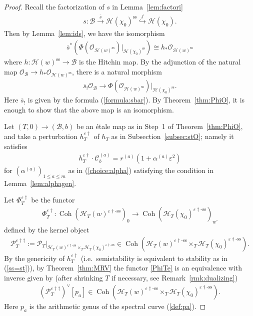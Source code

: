 \documentclass[11pt,oneside,a4paper,mathscr]{amsart}
\theoremstyle{definition}
\renewcommand{\leq}{\leqslant}
\newcommand{\cH}{\mathcal{H}}
\newcommand{\cB}{\mathcal{B}}
\newcommand{\cC}{\mathcal{C}}
\newcommand{\cP}{\mathcal{P}}
\newcommand{\cO}{\mathcal{O}}
\newcommand{\Coh}{\operatorname{Coh}}
\newcommand{\vd}{\varepsilon\dag}
\newcommand{\vdss}{\varepsilon\dag\text{-ss}}
\begin{document}
\begin{proof}
Recall the factorization of $s$ in Lemma~\ref{lem:factori}
\begin{align*}
s \colon \cB
\stackrel{\overline{s}}{\to}
\cH(\chi_0)^{\mathrm{ss}}
\stackrel{j}{\hookrightarrow}
\cH(\chi_0).
\end{align*}
Then by Lemma~\ref{lem:ids}, we have the isomorphism 
\begin{align*}
    \overline{s}^*(\Phi(\cO_{\cH(w)^{\mathrm{ss}}})|_{\cH(\chi_0)^{\mathrm{ss}}})\cong h_{*}\cO_{\cH(w)^{\mathrm{ss}}}
\end{align*}
where $h \colon \cH(w)^{\mathrm{ss}} \to \cB$ is the Hitchin map. 
By the adjunction of the natural map $\cO_{\cB} \to h_{*}\cO_{\cH(w)^{\mathrm{ss}}}$, 
there is a natural morphism
\begin{align}\label{map:sdag}
    \overline{s}_{!}\mathcal{O}_{\cB}
    \to
    \Phi(\mathcal{O}_{\cH(w)^{\mathrm{ss}}})
    |_{\cH(\chi_0)^{\mathrm{ss}}}.
\end{align}
Here $\overline{s}_!$ is given by the formula (\ref{formula:sbar}).  
By Theorem~\ref{thm:PhiO}, it is enough to show that the above map is an isomorphism.

Let $(T, 0) \to (\cB, b)$ be an \'{e}tale map as in Step~1 of Theorem~\ref{thm:PhiO}, 
and take a perturbation 
$h_T^{\vd}$ of $h_T$ as in Subsection~\ref{subsec:stO};
namely it satisfies 
\begin{align}\label{h:generic}
    h_T^{\varepsilon\dag} \cdot \cC_b^{(a)}=r^{(a)}(1+\alpha^{(a)}\varepsilon^2)
\end{align}
for $(\alpha^{(a)})_{1\leq a\leq m}$ as in (\ref{choice:alpha}) satisfying 
the condition in Lemma~\ref{lem:alphagen}.

Let $\Phi_T^{\vd}$ be the functor
\begin{align}\label{PhiTe}
\Phi_T^{\vd} \colon
\Coh(\cH_T(w)^{\vdss})_0
\to
\Coh(\cH_T(\chi_0)^{\vdss})_{w'}
\end{align}
defined by the kernel object
\begin{align*}
    \cP_T^{\vd\dag}
    :=
    \mathcal{P}_T
    |_{\cH_T(w)^{\vdss}
    \times_T
    \cH_T(\chi_0)^{\vdss}}
    \in
    \Coh(
    \cH_T(w)^{\vdss}
    \times_T
    \cH_T(\chi_0)^{\vdss}
    ).
\end{align*}
By the genericity of $h_T^{\vd}$ (i.e.\ semistability is equivalent to stability as in (\ref{ss=st})), 
by Theorem~\ref{thm:MRV} 
the functor \eqref{PhiTe} is an equivalence 
with inverse given by (after shrinking $T$ if necessary, see Remark~\ref{rmk:dualizing})
\begin{align}\label{kernel:inv2}
(\cP_T^{\vd\dag})^{\vee}[p_a]
\in
\Coh(
\cH_T(w)^{\vdss}
\times_T
\cH_T(\chi_0)^{\vdss}
).
\end{align}
Here $p_a$ is the arithmetic genus of the spectral curve (\ref{def:pa}). 


\end{proof}
\end{document}
